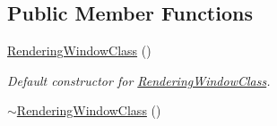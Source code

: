 \subsection*{Public Member Functions}
\begin{DoxyCompactItemize}
\item 
\hypertarget{classRenderingWindowClass_ad48948a08088e973aac8a57c96dee52c}{\hyperlink{classRenderingWindowClass_ad48948a08088e973aac8a57c96dee52c}{Rendering\-Window\-Class} ()}\label{classRenderingWindowClass_ad48948a08088e973aac8a57c96dee52c}

\begin{DoxyCompactList}\small\item\em Default constructor for \hyperlink{classRenderingWindowClass}{Rendering\-Window\-Class}. \end{DoxyCompactList}\item 
\hypertarget{classRenderingWindowClass_a10c28c3d432aa2e7864284301496fa85}{\hyperlink{classRenderingWindowClass_a10c28c3d432aa2e7864284301496fa85}{$\sim$\-Rendering\-Window\-Class} ()}\label{classRenderingWindowClass_a10c28c3d432aa2e7864284301496fa85}


\end{DoxyCompactItemize}
